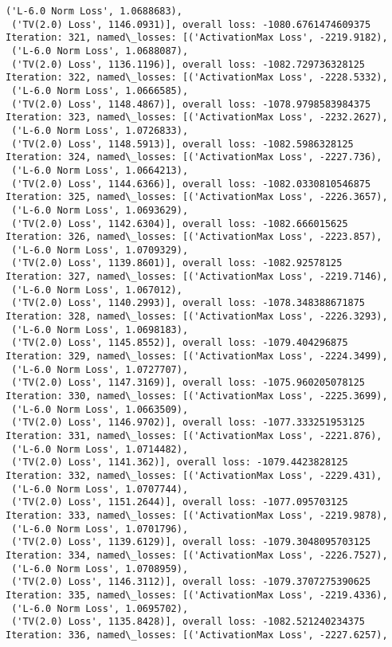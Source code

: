\documentclass[10pt]{article}
\begin{document}
\begin{Verbatim}[commandchars=\\\{\}]
 ('L-6.0 Norm Loss', 1.0688683),
 ('TV(2.0) Loss', 1146.0931)], overall loss: -1080.6761474609375
Iteration: 321, named\_losses: [('ActivationMax Loss', -2219.9182),
 ('L-6.0 Norm Loss', 1.0688087),
 ('TV(2.0) Loss', 1136.1196)], overall loss: -1082.729736328125
Iteration: 322, named\_losses: [('ActivationMax Loss', -2228.5332),
 ('L-6.0 Norm Loss', 1.0666585),
 ('TV(2.0) Loss', 1148.4867)], overall loss: -1078.9798583984375
Iteration: 323, named\_losses: [('ActivationMax Loss', -2232.2627),
 ('L-6.0 Norm Loss', 1.0726833),
 ('TV(2.0) Loss', 1148.5913)], overall loss: -1082.5986328125
Iteration: 324, named\_losses: [('ActivationMax Loss', -2227.736),
 ('L-6.0 Norm Loss', 1.0664213),
 ('TV(2.0) Loss', 1144.6366)], overall loss: -1082.0330810546875
Iteration: 325, named\_losses: [('ActivationMax Loss', -2226.3657),
 ('L-6.0 Norm Loss', 1.0693629),
 ('TV(2.0) Loss', 1142.6304)], overall loss: -1082.666015625
Iteration: 326, named\_losses: [('ActivationMax Loss', -2223.857),
 ('L-6.0 Norm Loss', 1.0709329),
 ('TV(2.0) Loss', 1139.8601)], overall loss: -1082.92578125
Iteration: 327, named\_losses: [('ActivationMax Loss', -2219.7146),
 ('L-6.0 Norm Loss', 1.067012),
 ('TV(2.0) Loss', 1140.2993)], overall loss: -1078.348388671875
Iteration: 328, named\_losses: [('ActivationMax Loss', -2226.3293),
 ('L-6.0 Norm Loss', 1.0698183),
 ('TV(2.0) Loss', 1145.8552)], overall loss: -1079.404296875
Iteration: 329, named\_losses: [('ActivationMax Loss', -2224.3499),
 ('L-6.0 Norm Loss', 1.0727707),
 ('TV(2.0) Loss', 1147.3169)], overall loss: -1075.960205078125
Iteration: 330, named\_losses: [('ActivationMax Loss', -2225.3699),
 ('L-6.0 Norm Loss', 1.0663509),
 ('TV(2.0) Loss', 1146.9702)], overall loss: -1077.333251953125
Iteration: 331, named\_losses: [('ActivationMax Loss', -2221.876),
 ('L-6.0 Norm Loss', 1.0714482),
 ('TV(2.0) Loss', 1141.362)], overall loss: -1079.4423828125
Iteration: 332, named\_losses: [('ActivationMax Loss', -2229.431),
 ('L-6.0 Norm Loss', 1.0707744),
 ('TV(2.0) Loss', 1151.2644)], overall loss: -1077.095703125
Iteration: 333, named\_losses: [('ActivationMax Loss', -2219.9878),
 ('L-6.0 Norm Loss', 1.0701796),
 ('TV(2.0) Loss', 1139.6129)], overall loss: -1079.3048095703125
Iteration: 334, named\_losses: [('ActivationMax Loss', -2226.7527),
 ('L-6.0 Norm Loss', 1.0708959),
 ('TV(2.0) Loss', 1146.3112)], overall loss: -1079.3707275390625
Iteration: 335, named\_losses: [('ActivationMax Loss', -2219.4336),
 ('L-6.0 Norm Loss', 1.0695702),
 ('TV(2.0) Loss', 1135.8428)], overall loss: -1082.521240234375
Iteration: 336, named\_losses: [('ActivationMax Loss', -2227.6257),

\end{Verbatim}
\end{document}
